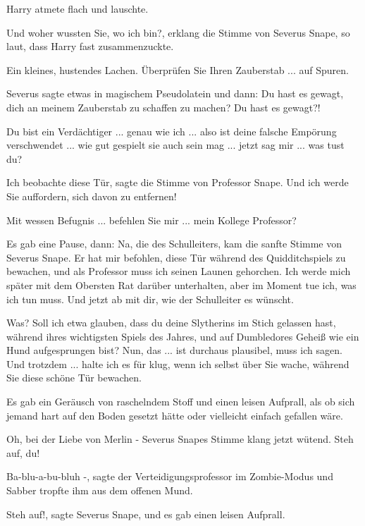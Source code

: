 Harry atmete flach und lauschte.

\glqq{}Und woher wussten Sie, wo ich bin?\grqq{}, erklang die Stimme von Severus
Snape, so laut, dass Harry fast zusammenzuckte.

Ein kleines, hustendes Lachen. \glqq{}Überprüfen Sie Ihren Zauberstab ... auf
Spuren.\grqq{}

Severus sagte etwas in magischem Pseudolatein und dann: \glqq{}Du hast es gewagt,
dich an meinem Zauberstab zu schaffen zu machen? Du hast es gewagt?!\grqq{}

\glqq{}Du bist ein Verdächtiger ... genau wie ich ... also ist deine falsche
Empörung verschwendet ... wie gut gespielt sie auch sein mag ... jetzt sag mir ...
was tust du?\grqq{}

\glqq{}Ich beobachte diese Tür\grqq{}, sagte die Stimme von Professor Snape.
\glqq{}Und ich werde Sie auffordern, sich davon zu entfernen!\grqq{}

\glqq{}Mit wessen Befugnis ... befehlen Sie mir ... mein Kollege Professor?\grqq{}

Es gab eine Pause, dann: \glqq{}Na, die des Schulleiters\grqq{}, kam die sanfte
Stimme von Severus Snape. \glqq{}Er hat mir befohlen, diese Tür während des
Quidditchspiels zu bewachen, und als Professor muss ich seinen Launen gehorchen.
Ich werde mich später mit dem Obersten Rat darüber unterhalten, aber im Moment
tue ich, was ich tun muss. Und jetzt ab mit dir, wie der Schulleiter es
wünscht.\grqq{}

\glqq{}Was? Soll ich etwa glauben, dass du deine Slytherins im Stich gelassen
hast, während ihres wichtigsten Spiels des Jahres, und auf Dumbledores Geheiß
wie ein Hund aufgesprungen bist? Nun, das ... ist durchaus plausibel, muss ich
sagen. Und trotzdem ... halte ich es für klug, wenn ich selbst über Sie wache,
während Sie diese schöne Tür bewachen.\grqq{}

Es gab ein Geräusch von raschelndem Stoff und einen leisen Aufprall, als ob sich
jemand hart auf den Boden gesetzt hätte oder vielleicht einfach gefallen wäre.

\glqq{}Oh, bei der Liebe von Merlin -\grqq{} Severus Snapes Stimme klang jetzt
wütend. \glqq{}Steh auf, du!\grqq{}

\glqq{}Ba-blu-a-bu-bluh -\grqq{}, sagte der Verteidigungsprofessor im
Zombie-Modus und Sabber tropfte ihm aus dem offenen Mund.

\glqq{}Steh auf!\grqq{}, sagte Severus Snape, und es gab einen leisen Aufprall.

